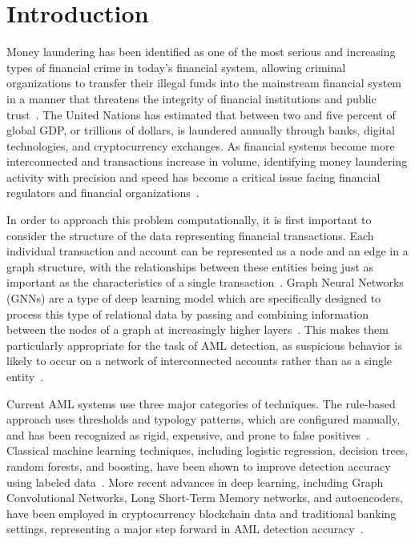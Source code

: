 \documentclass[conference]{IEEEtran}
\begin{document}
\section{Introduction}


Money laundering has been identified as one of the most serious and increasing types of financial crime in today's financial system, allowing criminal organizations to transfer their illegal funds into the mainstream financial system in a manner that threatens the integrity of financial institutions and public trust~\cite{han2020, chen2018}. The United Nations has estimated that between two and five percent of global GDP, or trillions of dollars, is laundered annually through banks, digital technologies, and cryptocurrency exchanges. As financial systems become more interconnected and transactions increase in volume, identifying money laundering activity with precision and speed has become a critical issue facing financial regulators and financial organizations~\cite{hilal2022, canhoto2021}.

In order to approach this problem computationally, it is first important to consider the structure of the data representing financial transactions. Each individual transaction and account can be represented as a node and an edge in a graph structure, with the relationships between these entities being just as important as the characteristics of a single transaction~\cite{weber2019}. Graph Neural Networks (GNNs) are a type of deep learning model which are specifically designed to process this type of relational data by passing and combining information between the nodes of a graph at increasingly higher layers~\cite{kurshan2021}. This makes them particularly appropriate for the task of AML detection, as suspicious behavior is likely to occur on a network of interconnected accounts rather than as a single entity~\cite{cheng2023}.

Current AML systems use three major categories of techniques. The rule-based approach uses thresholds and typology patterns, which are configured manually, and has been recognized as rigid, expensive, and prone to false positives~\cite{jullum2020}. Classical machine learning techniques, including logistic regression, decision trees, random forests, and boosting, have been shown to improve detection accuracy using labeled data~\cite{vassallo2021}. More recent advances in deep learning, including Graph Convolutional Networks, Long Short-Term Memory networks, and autoencoders, have been employed in cryptocurrency blockchain data and traditional banking settings, representing a major step forward in AML detection accuracy~\cite{alarab2020, altman2023}.
\end{document}
